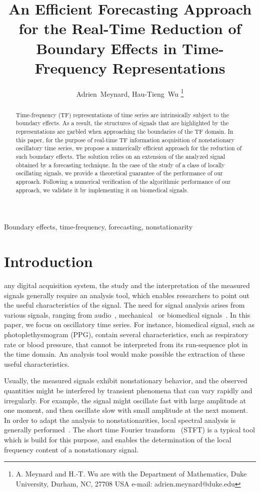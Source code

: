 \documentclass[journal]{IEEEtran}
\title{An Efficient Forecasting Approach for the Real-Time Reduction of Boundary Effects in Time-Frequency Representations}
\author{Adrien~Meynard, %
        Hau-Tieng~Wu
\thanks{A. Meynard and H.-T. Wu are with the Department
of Mathematics, Duke University, Durham,
NC, 27708 USA e-mail: adrien.meynard@duke.edu}}
\begin{document}
\maketitle

\begin{abstract}
Time-frequency (TF) representations of time series are intrinsically subject to the boundary effects. As a result, the structures of signals that are highlighted by the representations are garbled when approaching the boundaries of the TF domain. In this paper, for the purpose of real-time TF information acquisition of nonstationary oscillatory time series, we propose a numerically efficient approach for the reduction of such boundary effects. The solution relies on an extension of the analyzed signal obtained by a forecasting technique. In the case of the study of a class of locally oscillating signals, we provide a theoretical guarantee of the performance of our approach. Following a numerical verification of the algorithmic performance of our approach, we validate it by implementing it on biomedical signals.
\end{abstract}

\begin{IEEEkeywords}
Boundary effects, time-frequency, forecasting, nonstationarity
\end{IEEEkeywords}

\section{Introduction}
\label{se:introduction}
 any digital acquisition system, the study and the interpretation of the measured signals generally require an analysis tool, which enables researchers to point out the useful characteristics of the signal. The need for signal analysis arises from various signals, ranging from audio~\cite{Stowell18computational,Muller11signal}, mechanical~\cite{Peng02vibration} or biomedical signals~\cite{Akay96detection}. In this paper, we focus on oscillatory time series. For instance, biomedical signal, such as photoplethysmogram (PPG), contain several characteristics, such as respiratory rate or blood pressure, that cannot be interpreted from its run-sequence plot in the time domain. An analysis tool would make possible the extraction of these useful characteristics. 

Usually, the measured signals exhibit nonstationary behavior, and the observed quantities might be interfered by transient phenomena that can vary rapidly and irregularly. For example, the signal might oscillate fast with large amplitude at one moment, and then oscillate slow with small amplitude at the next moment. In order to adapt the analysis to nonstationarities, local spectral analysis is generally performed~\cite{Stoica05spectral,Matz97generalized}. The short time Fourier transform~\cite{Grochenig01foundations} (STFT) is a typical tool which is build for this purpose, and enables the determination of the local frequency content of a nonstationary signal.
\end{document}
